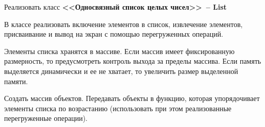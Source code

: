 Реализовать класс \textbf{<<Односвязный список целых чисел>>~-- List}


В классе реализовать включение элементов в
список, извлечение элементов, присваивание и вывод на экран с помощью перегруженных
операций.

Элементы списка хранятся в массиве. Если массив имеет фиксированную
размерность, то предусмотреть контроль выхода за пределы массива. Если память
выделяется динамически и ее не хватает, то увеличить размер выделенной памяти.

Создать
массив объектов. Передавать объекты в функцию, которая упорядочивает элементы списка
по возрастанию (использовать при этом реализованные перегруженные операции).
